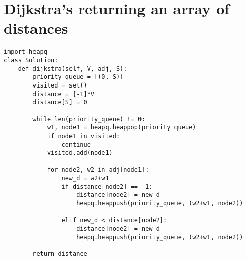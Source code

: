 \documentclass[24pt, a4]{article}
\begin{document}
\section{Dijkstra's returning an array of distances}
\begin{lstlisting}
import heapq
class Solution:
    def dijkstra(self, V, adj, S):
        priority_queue = [(0, S)]
        visited = set()
        distance = [-1]*V
        distance[S] = 0

        while len(priority_queue) != 0:
            w1, node1 = heapq.heappop(priority_queue)
            if node1 in visited:
                continue
            visited.add(node1)

            for node2, w2 in adj[node1]:
                new_d = w2+w1
                if distance[node2] == -1:
                    distance[node2] = new_d
                    heapq.heappush(priority_queue, (w2+w1, node2))

                elif new_d < distance[node2]:
                    distance[node2] = new_d
                    heapq.heappush(priority_queue, (w2+w1, node2))
        
        return distance
\end{lstlisting}
\end{document}
